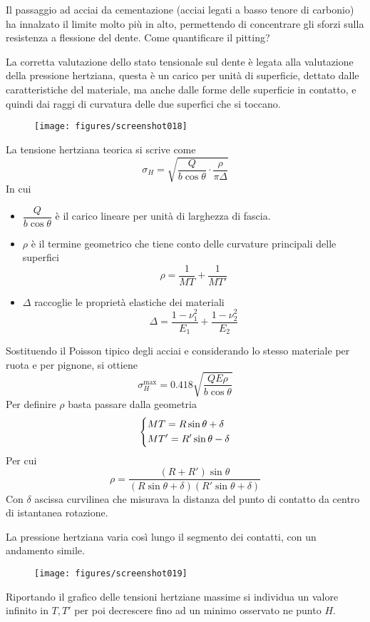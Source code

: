 \documentclass[a4paper, 15pt]{article}
\begin{document}
\begin{adjustwidth}{2in}{}
	Il passaggio ad acciai da cementazione (acciai legati a basso tenore di carbonio) ha innalzato il limite molto più in alto, permettendo di concentrare gli sforzi sulla resistenza a flessione del dente.  
\newpage	
	Come quantificare il pitting?
	
	La corretta valutazione  dello stato tensionale sul dente è legata alla valutazione della pressione hertziana, questa è un carico per unità di superficie, dettato dalle caratteristiche del materiale, ma anche dalle forme delle superficie in contatto, e quindi dai raggi di curvatura delle due superfici che si toccano. 
	\begin{figure}[H]
		\centering
		\texttt{[image: figures/screenshot018]}
		\caption{}
		\label{fig:screenshot018}
	\end{figure}	
	La tensione hertziana teorica si scrive come 
	\[\sigma_H = \sqrt{\dfrac{Q}{b\cos\theta} \cdot \dfrac{\rho}{\pi\Delta}}\] 
	In cui 
	\begin{itemize}
		\item $\dfrac{Q}{b\cos\theta}$ è il carico lineare per unità di larghezza di fascia. 
		\item $\rho$ è il termine geometrico che tiene conto delle curvature principali delle superfici 
		\[\rho = \dfrac{1}{MT} + \dfrac{1}{MT'}\]
		\item $\Delta$ raccoglie le proprietà elastiche dei materiali 
		\[\Delta = \dfrac{1-\nu_1^2}{E_1} + \dfrac{1-\nu_2^2}{E_2}\]
	\end{itemize}
	Sostituendo il Poisson tipico degli acciai e considerando lo stesso materiale per ruota e per pignone, si ottiene 
	\[\sigma_H^{\max} = 0.418\sqrt{\dfrac{QE\rho}{b\cos\theta}}\]
	Per definire $\rho$ basta passare dalla geometria
	\[\begin{dcases}
		MT = R\sin\theta + \delta \\
		MT' = R'\sin\theta - \delta
	\end{dcases}\]
	Per cui
	\[\rho = \dfrac{(R+R')\sin\theta}{(R\sin\theta+\delta)(R'\sin\theta+\delta)}\]
	Con $\delta$ ascissa curvilinea che misurava la distanza del punto di contatto da centro di istantanea rotazione. \newline 
	
	La pressione hertziana varia così lungo il segmento dei contatti, con un andamento simile. 
	\begin{figure}[H]
		\centering
		\texttt{[image: figures/screenshot019]}
		\label{fig:screenshot019}
	\end{figure}
	Riportando il grafico delle tensioni hertziane massime si individua un valore infinito in $T, T'$ per poi decrescere fino ad un minimo osservato ne punto $H$. \newline 
	

\end{adjustwidth}
\end{document}
